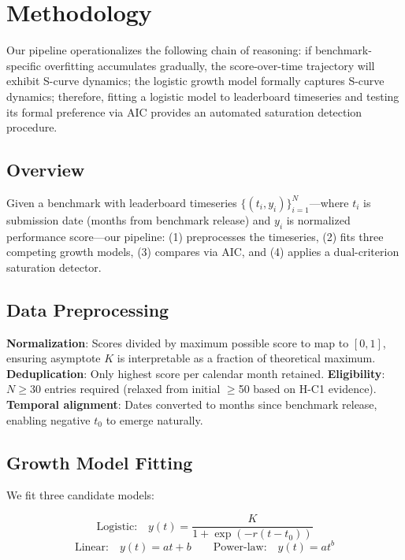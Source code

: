 \section{Methodology}

Our pipeline operationalizes the following chain of reasoning: if benchmark-specific overfitting accumulates gradually, the score-over-time trajectory will exhibit S-curve dynamics; the logistic growth model formally captures S-curve dynamics; therefore, fitting a logistic model to leaderboard timeseries and testing its formal preference via AIC provides an automated saturation detection procedure.

\subsection{Overview}

Given a benchmark with leaderboard timeseries $\{(t_i, y_i)\}_{i=1}^{N}$---where $t_i$ is submission date (months from benchmark release) and $y_i$ is normalized performance score---our pipeline: (1) preprocesses the timeseries, (2) fits three competing growth models, (3) compares via AIC, and (4) applies a dual-criterion saturation detector.

\subsection{Data Preprocessing}

\textbf{Normalization}: Scores divided by maximum possible score to map to $[0, 1]$, ensuring asymptote $K$ is interpretable as a fraction of theoretical maximum.
\textbf{Deduplication}: Only highest score per calendar month retained.
\textbf{Eligibility}: $N \geq 30$ entries required (relaxed from initial $\geq$50 based on H-C1 evidence).
\textbf{Temporal alignment}: Dates converted to months since benchmark release, enabling negative $t_0$ to emerge naturally.

\subsection{Growth Model Fitting}

We fit three candidate models:

\begin{equation}
  \text{Logistic:} \quad y(t) = \frac{K}{1 + \exp(-r(t - t_0))}
\end{equation}
\begin{equation}
  \text{Linear:} \quad y(t) = at + b \qquad \text{Power-law:} \quad y(t) = at^b
\end{equation}

